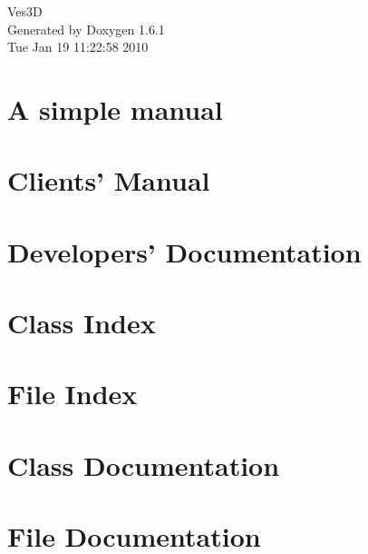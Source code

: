 \documentclass[a4paper]{book}
\begin{document}
\hypersetup{pageanchor=false}
\begin{titlepage}
\vspace*{7cm}
\begin{center}
{\Large Ves3D }\\
\vspace*{1cm}
{\large Generated by Doxygen 1.6.1}\\
\vspace*{0.5cm}
{\small Tue Jan 19 11:22:58 2010}\\
\end{center}
\end{titlepage}
\clearemptydoublepage
{}
\tableofcontents
\clearemptydoublepage
{}
\hypersetup{pageanchor=true}
\chapter{A simple manual}
\label{index}\hypertarget{index}{}
\chapter{Clients' Manual}
\label{Client}
\hypertarget{Client}{}

\chapter{Developers' Documentation}
\label{Developer}
\hypertarget{Developer}{}

\chapter{Class Index}

\chapter{File Index}

\chapter{Class Documentation}

\chapter{File Documentation}


\printindex
\end{document}
